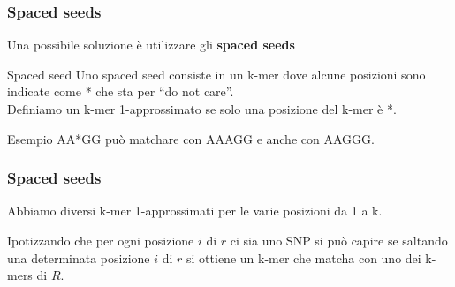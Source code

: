 \documentclass[
	11pt, %
]{beamer}
\begin{document}





\begin{frame}
	\frametitle{Spaced seeds}
	
	Una possibile soluzione è utilizzare gli \textbf{spaced seeds}
	
	\begin{block}{Spaced seed}
		Uno spaced seed consiste in un k-mer dove alcune posizioni sono indicate come * che sta per “do not care”. \\
		Definiamo un k-mer 1-approssimato se solo una posizione del k-mer è *.
	\end{block}
	
	\begin{exampleblock}{Esempio}
		 AA*GG può matchare con  AAAGG e anche con AAGGG.
	\end{exampleblock}
	

\end{frame}


\begin{frame}
	\frametitle{Spaced seeds}
	
	Abbiamo diversi k-mer 1-approssimati per le varie posizioni da 1 a k.
	
	Ipotizzando che per ogni posizione $i$ di $r$ ci sia uno SNP si può capire se saltando una determinata posizione $i$ di $r$ si ottiene un k-mer che matcha con uno dei k-mers di $R$.
	
\end{frame}

\end{document}
